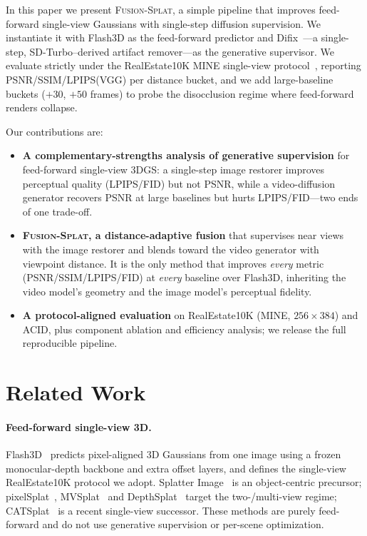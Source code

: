 \documentclass[10pt,twocolumn,letterpaper]{article}
\newcommand{\method}{\textsc{Fusion-Splat}}
\begin{document}
In this paper we present \method{}, a simple pipeline that improves
feed-forward single-view Gaussians with single-step diffusion supervision. We
instantiate it with Flash3D as the feed-forward predictor and
Difix~\cite{difix}---a single-step, SD-Turbo--derived artifact remover---as the
generative supervisor. We evaluate strictly under the RealEstate10K MINE
single-view protocol~\cite{mine,flash3d}, reporting PSNR/SSIM/LPIPS(VGG) per
distance bucket, and we add large-baseline buckets ($+30$, $+50$ frames) to
probe the disocclusion regime where feed-forward renders collapse.

Our contributions are:

\begin{itemize}
\item \textbf{A complementary-strengths analysis of generative supervision} for
feed-forward single-view 3DGS: a single-step image restorer improves perceptual
quality (LPIPS/FID) but not PSNR, while a video-diffusion generator recovers
PSNR at large baselines but hurts LPIPS/FID---two ends of one trade-off.
\item \textbf{\method{}, a distance-adaptive fusion} that supervises near views
with the image restorer and blends toward the video generator with viewpoint
distance. It is the only method that improves \emph{every} metric
(PSNR/SSIM/LPIPS/FID) at \emph{every} baseline over Flash3D, inheriting the
video model's geometry and the image model's perceptual fidelity.
\item \textbf{A protocol-aligned evaluation} on RealEstate10K (MINE,
$256{\times}384$) and ACID, plus component ablation and efficiency analysis; we
release the full reproducible pipeline.
\end{itemize}

\section{Related Work}
\label{sec:related}

\paragraph{Feed-forward single-view 3D.}
Flash3D~\cite{flash3d} predicts pixel-aligned 3D Gaussians from one image using
a frozen monocular-depth backbone and extra offset layers, and defines the
single-view RealEstate10K protocol we adopt. Splatter
Image~\cite{splatterimage} is an object-centric precursor;
pixelSplat~\cite{pixelsplat}, MVSplat~\cite{mvsplat} and
DepthSplat~\cite{depthsplat} target the two-/multi-view regime;
CATSplat~\cite{catsplat} is a recent single-view successor. These methods are
purely feed-forward and do not use generative supervision or per-scene
optimization.
\end{document}
